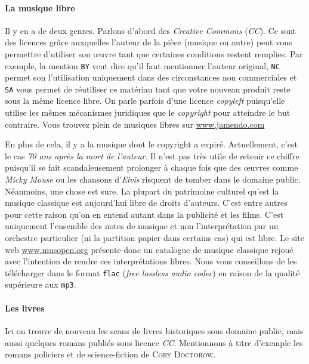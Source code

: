 \paragraph{La musique libre}
Il y en a de deux genres. Parlons d'abord des \textit{Creative Commons} (\textit{CC}). Ce sont des licences grâce auxquelles l'auteur de la pièce (musique ou autre) peut vous permettre
d'utiliser son \oe uvre tant que certaines conditions restent remplies. Par exemple, la mention \texttt{BY} veut dire qu'il faut mentionner l'auteur original, \texttt{NC} permet son l'utilisation 
uniquement dans des circonstances non commerciales et \texttt{SA} vous permet de réutiliser ce matériau tant que votre nouveau produit reste sous la même licence libre. 
On parle parfois d'une licence \textit{copyleft} puisqu'elle utilise les mêmes mécanismes juridiques que le \textit{copyright} pour atteindre le but contraire. Vous trouvez plein de musiques libres sur \url{www.jamendo.com}

En plus de cela, il y a la musique dont le copyright a expiré. Actuellement, c'est le cas \textit{70 ans après la mort de l'auteur}.
Il n'est pas très utile de retenir ce chiffre puisqu'il se fait scandaleusement prolonger à chaque fois que des \oe uvres comme \textit{Micky Mouse} 
ou les chansons d'\textit{Elvis} risquent de tomber dans le domaine public.
Néanmoins, une chose est sure. La plupart du patrimoine culturel qu'est la musique classique est aujourd'hui libre de droits d'auteurs.
C'est entre autres pour cette raison qu'on en entend autant dans la publicité et les films.
C'est uniquement l'ensemble des notes de musique et non l'interprétation par un orchestre particulier (ni la partition papier dans certains cas) qui est libre.
Le site web \url{www.musopen.org} présente donc un catalogue de musique classique rejoué avec l'intention de rendre ces interprétations libres.
Nous vous conseillons de les télécharger dans le format \texttt{flac} (\textit{free lossless audio codec}) en raison de la qualité supérieure aux \texttt{mp3}.

\paragraph{Les livres}
Ici on trouve de nouveau les scans de livres historiques sous domaine public, mais aussi quelques romans publiés sous licence \textit{CC}.
Mentionnons à titre d'exemple les romans policiers et de science-fiction de \textsc{Cory Doctorow}.

